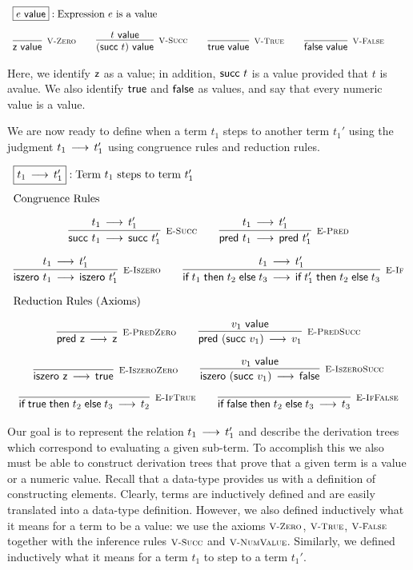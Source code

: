\[
\begin{array}{c}
\multicolumn{1}{l}{\fbox{$e \Value$}: \mbox{Expression $e$ is a value}}\\[1em]
\infer[\VZero]{\tmzero \Value}{} \qquad
\infer[\VSucc]{(\tmsucc t) \Value}{t \Value} \qquad
\infer[\VTrue]{\tmtrue \Value}{} \qquad
\infer[\VFalse]{\tmfalse \Value}{} \qquad
\end{array}
\]

Here, we identify $\textsf{z}$ as a value; in addition, $\textsf{succ}~t$ is a
value provided that $t$ is avalue. We also identify $\textsf{true}$
and $\textsf{false}$ as values, and say that every numeric value is a value.

We are now ready to define when a term $t_1$ steps to another term $t_1'$ using
the judgment $t_1 \mathrel{\,\longrightarrow\,} t_1'$ using congruence rules and reduction rules.

\[
\begin{array}{c}
\multicolumn{1}{l}{\fbox{$t_1 \Steps t_1'$}: \mbox{Term $t_1$ steps to term $t_1'$}}
\\[1em]
\multicolumn{1}{l}{\mbox{\text{Congruence Rules}}}
\\[1em]
\infer[\ESucc]{\tmsucc t_1 \Steps \tmsucc t_1'}{t_1 \Steps t_1'}\qquad
\infer[\EPred]{\tmpred t_1 \Steps \tmpred t_1'}{t_1 \Steps t_1'}
\\[1em]
\infer[\EIsZero]{\tmiszero t_1 \Steps \tmiszero t_1'}{t_1 \Steps t_1'}\qquad
\infer[\EIf]{\tmif{t_1}{t_2}{t_3} \Steps \tmif{t_1'}{t_2}{t_3}}{t_1 \Steps t_1'}
\\[1em]
\multicolumn{1}{l}{\mbox{\text{Reduction Rules (Axioms)}}}
\\[1em]
\infer[\EPredZ]{\tmpred \tmzero \Steps \tmzero}{}\qquad
\infer[\EPredSucc]{\tmpred (\tmsucc v_1) \Steps v_1}{v_1 \Value}
\\[1em]
\infer[\EIsZeroZ]{\tmiszero \tmzero \Steps \tmtrue}{} \qquad
\infer[\EIsZeroSucc]{\tmiszero (\tmsucc v_1) \Steps \tmfalse}{v_1 \Value}
\\[1em]
\infer[\EIfT]{\tmif \tmtrue {t_2}{t_3} \Steps t_2}{}\qquad
\infer[\EIfF]{\tmif \tmfalse {t_2}{t_3} \Steps t_3}{}
\end{array}
\]

Our  goal  is  to  represent  the  relation  $t_1 \mathrel{\,\longrightarrow\,} t_1'$ and  describe the
derivation trees which correspond to evaluating a given sub-term.
To accomplish this we also must be able to construct derivation trees that prove
that  a given  term is  a value  or a  numeric  value. Recall  that a  data-type
provides us with a definition of constructing elements.
Clearly,  terms  are  inductively  defined  and  are  easily  translated  into a
data-type definition. However,  we also defined inductively  what it means for a
term  to be a value:  we use the  axioms $\textsc{\footnotesize V-Zero}$, $\textsc{\footnotesize V-True}$,
$\textsc{\footnotesize V-False}$  together  with  the   inference  rules  $\textsc{\footnotesize V-Succ}$  and  $\textsc{\footnotesize V-NumValue}$.
Similarly,  we defined inductively  what it means for a term $t_1$  to step to a
term $t_1'$.

